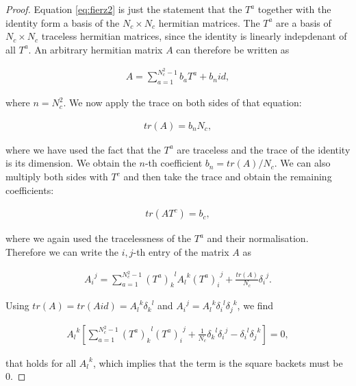 \documentclass{article}
\theoremstyle{definition}
\numberwithin{equation}{section}
\begin{document}
\begin{proof}

Equation \eqref{eq:fierz2} is just the statement that the $T^a$ together with the identity form a basis of the $N_c \times N_c$ hermitian matrices. The $T^a$ are a basis of $N_c \times N_c$ traceless hermitian matrices, since the identity is linearly indepdenant of all $T^a$. An arbitrary hermitian matrix $A$ can therefore be written as

\begin{align*}
    A = \sum_{a=1}^{N_c^2 -1} b_a T^a + b_n id,
\end{align*}

where $n=N_c^2$. We now apply the trace on both sides of that equation:

\begin{align*}
    tr \left( A \right) = b_n N_c,
\end{align*}

where we have used the fact that the $T^a$ are traceless and the trace of the identity is its dimension. We obtain the $n$-th coefficient $b_n = tr \left( A \right) /N_c$. We can also multiply both sides with $T^c$ and then take the trace and obtain the remaining coefficients:

\begin{align*}
    tr \left( A T^c \right) = b_c,
\end{align*}

where we again used the tracelessness of the $T^a$ and their normalisation. Therefore we can write the $i,j$-th entry of the matrix $A$ as

\begin{align*}
    {A_{i}}^{j} = \sum_{a=1}^{N_c^2 -1} {(T^a)_{k}}^{l} {A_{l}}^{k} {(T^a)_{i}}^{j} + \frac{tr \left( A \right)}{N_c} {\delta_{i}}^{j}.
\end{align*}

Using $tr \left( A \right) = tr \left( A id \right) = {A_{l}}^{k} {\delta_{k}}^{l}$ and ${A_{i}}^{j} = {A_{l}}^{k} {\delta_i}^l {\delta_j}^k$, we find

\begin{align*}
    {A_{l}}^{k} \left[ \sum_{a=1}^{N_c^2 -1} {(T^a)_k}^l {(T^a)_i}^j + \frac{1}{N_c} {\delta_k}^l {\delta_i}^j - {\delta_i}^l {\delta_j}^k \right] = 0,
\end{align*}

that holds for all ${A_{l}}^{k}$, which implies that the term is the square backets must be $0$.

\end{proof}
\end{document}
